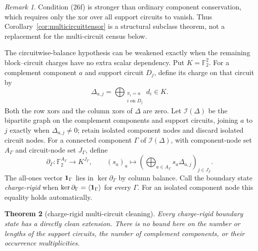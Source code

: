 \documentclass[11pt]{article}
\newtheorem{theorem}{Theorem}[section]
\theoremstyle{definition}
\theoremstyle{remark}
\newtheorem{remark}[theorem]{Remark}
\begin{document}
\begin{remark}
Condition (26f) is stronger than ordinary component conservation, which
requires only the xor over all support circuits to vanish.  Thus
Corollary~\ref{cor:multicircuittensor} is a structural subclass theorem,
not a replacement for the multi-circuit census below.
\end{remark}

The circuitwise-balance hypothesis can be weakened exactly when the
remaining block--circuit charges have no extra scalar dependency.  Put
$K=\mathbb F_2^2$.  For a complement component $a$ and support circuit
$D_j$, define its charge on that circuit by
\[
 \Delta_{a,j}=
 \bigoplus_{\substack{\pi_i=a\\ i\text{ on }D_j}}d_i\in K.       \tag{26g}
\]
Both the row xors and the column xors of $\Delta$ are zero.  Let
$\mathcal I(\Delta)$ be the bipartite graph on the complement components
and support circuits, joining $a$ to $j$ exactly when
$\Delta_{a,j}\ne0$; retain isolated component nodes and discard isolated
circuit nodes.  For a connected component $\Gamma$ of
$\mathcal I(\Delta)$, with component-node set $A_\Gamma$ and circuit-node
set $J_\Gamma$, define
\[
 \partial_\Gamma:\mathbb F_2^{A_\Gamma}\longrightarrow K^{J_\Gamma},
 \qquad
 (s_a)_a\longmapsto
 \left(\bigoplus_{a\in A_\Gamma}s_a\Delta_{a,j}\right)_{j\in J_\Gamma}.
                                                               \tag{26h}
\]
The all-ones vector ${\bf1}_\Gamma$ lies in
$\ker\partial_\Gamma$ by column balance.  Call the boundary state
\emph{charge-rigid} when
$\ker\partial_\Gamma=\langle{\bf1}_\Gamma\rangle$ for every $\Gamma$.
For an isolated component node this equality holds automatically.

\begin{theorem}[charge-rigid multi-circuit cleaning]
\label{thm:chargerigid}
Every charge-rigid boundary state has a directly clean extension.
There is no bound here on the number or lengths of the support circuits,
the number of complement components, or their occurrence multiplicities.
\end{theorem}
\end{document}
